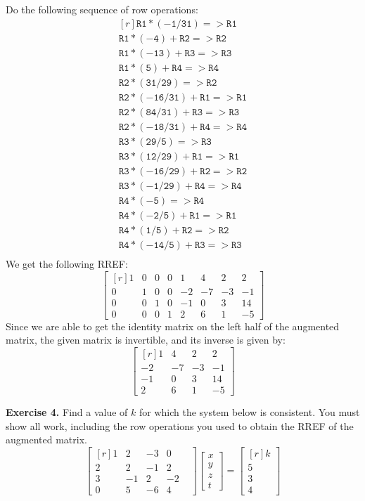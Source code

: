 \documentclass[12pt]{article}
\begin{document}
Do the following sequence of row operations:
\[
\begin{matrix*}[r]
\mathtt{R1*(-1/31)=>R1}\\
\mathtt{R1*(-4)+R2=>R2}\\
\mathtt{R1*(-13)+R3=>R3}\\
\mathtt{R1*(5)+R4=>R4}\\
\mathtt{R2*(31/29)=>R2}\\
\mathtt{R2*(-16/31)+R1=>R1}\\
\mathtt{R2*(84/31)+R3=>R3}\\
\mathtt{R2*(-18/31)+R4=>R4}\\
\mathtt{R3*(29/5)=>R3}\\
\mathtt{R3*(12/29)+R1=>R1}\\
\mathtt{R3*(-16/29)+R2=>R2}\\
\mathtt{R3*(-1/29)+R4=>R4}\\
\mathtt{R4*(-5)=>R4}\\
\mathtt{R4*(-2/5)+R1=>R1}\\
\mathtt{R4*(1/5)+R2=>R2}\\
\mathtt{R4*(-14/5)+R3=>R3}\\
\end{matrix*}
\]
We get the following RREF:
\[
\left[\begin{matrix*}[r]1 & 0 & 0 & 0 & 1 & 4 & 2 & 2\\0 & 1 & 0 & 0 & -2 & -7 & -3 & -1\\0 & 0 & 1 & 0 & -1 & 0 & 3 & 14\\0 & 0 & 0 & 1 & 2 & 6 & 1 & -5\end{matrix*}\right]
\]
Since we are able to get the identity matrix on the left half of the augmented matrix, the given matrix is invertible, and its inverse is given by:
\[
\left[\begin{matrix*}[r]
1 & 4 & 2 & 2\\
-2 & -7 & -3 & -1\\
-1 & 0 & 3 & 14\\
2 & 6 & 1 & -5\end{matrix*}
\right]
\]
\proofend


\textbf{Exercise 4.} Find a value of $k$ for which the system below is consistent. You must show all work, including the row operations you used to obtain the RREF of the augmented matrix.
\[
\left[\begin{matrix*}[r]1 & 2 & -3 & 0 \\2 & 2 & -1 & 2 \\3 & -1 & 2 & -2 \\0 & 5 & -6 & 4 & \end{matrix*}\right]
\begin{bmatrix}x\\y\\z\\t\end{bmatrix}=
\begin{bmatrix*}[r] k\\5\\3\\4\end{bmatrix*}
\]
\end{document}

